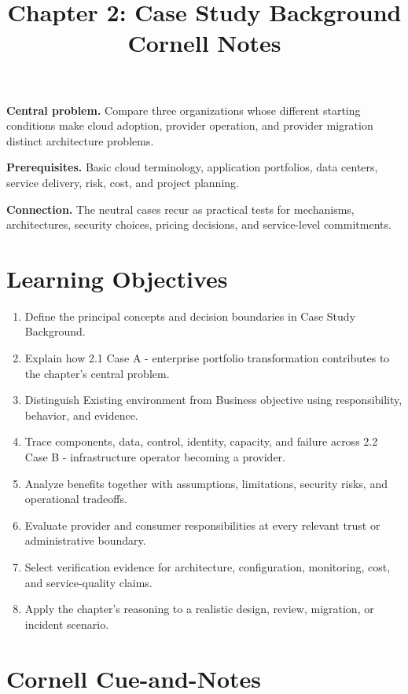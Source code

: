 \documentclass[11pt]{article}
\title{Chapter 2: Case Study Background\\[2mm]\large Cornell Notes}
\author{}
\date{}
\begin{document}
\maketitle
\thispagestyle{fancy}
\vspace{-1.5em}
\begin{orientationbox}
\textbf{Central problem.} Compare three organizations whose different starting conditions make cloud adoption, provider operation, and provider migration distinct architecture problems.\par\smallskip
\textbf{Prerequisites.} Basic cloud terminology, application portfolios, data centers, service delivery, risk, cost, and project planning.\par\smallskip
\textbf{Connection.} The neutral cases recur as practical tests for mechanisms, architectures, security choices, pricing decisions, and service-level commitments.
\end{orientationbox}
\section{Learning Objectives}
\begin{enumerate}
\item Define the principal concepts and decision boundaries in Case Study Background.
\item Explain how 2.1 Case A - enterprise portfolio transformation contributes to the chapter's central problem.
\item Distinguish Existing environment from Business objective using responsibility, behavior, and evidence.
\item Trace components, data, control, identity, capacity, and failure across 2.2 Case B - infrastructure operator becoming a provider.
\item Analyze benefits together with assumptions, limitations, security risks, and operational tradeoffs.
\item Evaluate provider and consumer responsibilities at every relevant trust or administrative boundary.
\item Select verification evidence for architecture, configuration, monitoring, cost, and service-quality claims.
\item Apply the chapter's reasoning to a realistic design, review, migration, or incident scenario.
\end{enumerate}
\section{Cornell Cue-and-Notes}
\end{document}
